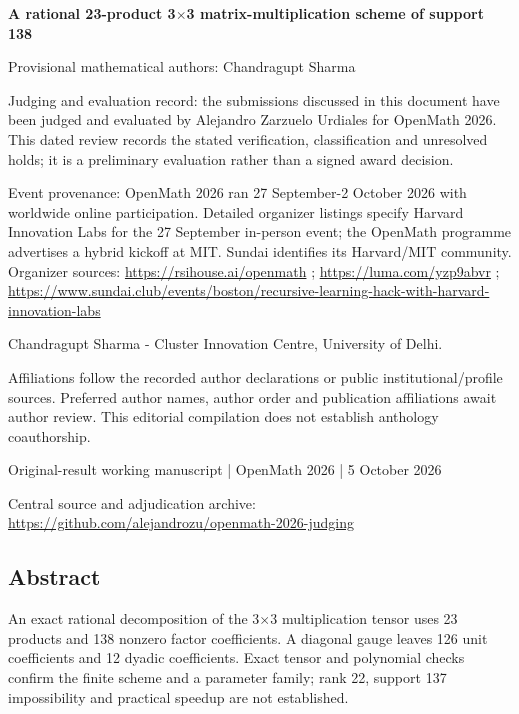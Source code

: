 \documentclass[11pt,a4paper]{article}
\begin{document}
{\LARGE\bfseries A rational 23-product 3\ensuremath{\times}3 matrix-multiplication scheme of support 138\par}\medskip
{\small Provisional mathematical authors: Chandragupt Sharma\par}\medskip
{\small Judging and evaluation record: the submissions discussed in this document have been judged and evaluated by Alejandro Zarzuelo Urdiales for OpenMath 2026. This dated review records the stated verification, classification and unresolved holds; it is a preliminary evaluation rather than a signed award decision.\par}

{\small Event provenance: OpenMath 2026 ran 27 September-2 October 2026 with worldwide online participation. Detailed organizer listings specify Harvard Innovation Labs for the 27 September in-person event; the OpenMath programme advertises a hybrid kickoff at MIT. Sundai identifies its Harvard/MIT community. Organizer sources: \url{https://rsihouse.ai/openmath} ; \url{https://luma.com/yzp9abvr} ; \url{https://www.sundai.club/events/boston/recursive-learning-hack-with-harvard-innovation-labs}\par}

{\small Chandragupt Sharma  -  Cluster Innovation Centre, University of Delhi.\par}

{\small Affiliations follow the recorded author declarations or public institutional/profile sources. Preferred author names, author order and publication affiliations await author review. This editorial compilation does not establish anthology coauthorship.\par}

{\small Original-result working manuscript | OpenMath 2026 | 5 October 2026\par}\medskip
{\small Central source and adjudication archive: \url{https://github.com/alejandrozu/openmath-2026-judging}\par}

\subsection{Abstract}
An exact rational decomposition of the 3\ensuremath{\times}3 multiplication tensor uses 23 products and 138 nonzero factor coefficients. A diagonal gauge leaves 126 unit coefficients and 12 dyadic coefficients. Exact tensor and polynomial checks confirm the finite scheme and a parameter family; rank 22, support 137 impossibility and practical speedup are not established.
\end{document}
